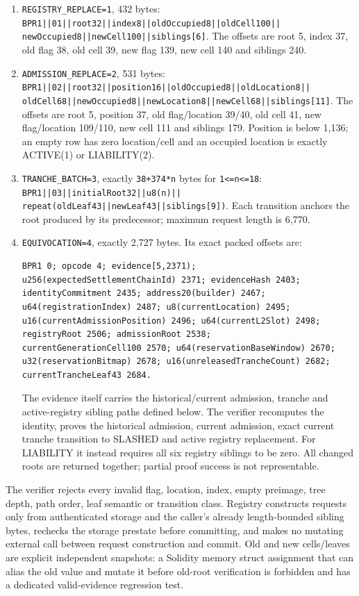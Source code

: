 \documentclass[a4paper,11pt]{article}
\newcommand{\code}[1]{\nolinkurl{#1}}
\begin{document}
\begin{enumerate}
\item \code{REGISTRY_REPLACE=1}, 432 bytes:
\code{BPR1||01||root32||index8||oldOccupied8||oldCell100||}
\code{newOccupied8||newCell100||siblings[6]}.  The offsets are root 5,
index 37, old flag 38, old cell 39, new flag 139, new cell 140 and siblings
240.
\item \code{ADMISSION_REPLACE=2}, 531 bytes:
\code{BPR1||02||root32||position16||oldOccupied8||oldLocation8||}
\code{oldCell68||newOccupied8||newLocation8||newCell68||siblings[11]}.
The offsets are root 5, position 37, old flag/location 39/40, old cell 41,
new flag/location 109/110, new cell 111 and siblings 179.  Position is below
1,136; an empty row has zero location/cell and an occupied location is exactly
ACTIVE(1) or LIABILITY(2).
\item \code{TRANCHE_BATCH=3}, exactly \code{38+374*n} bytes for
\code{1<=n<=18}:
\code{BPR1||03||initialRoot32||u8(n)||}
\code{repeat(oldLeaf43||newLeaf43||siblings[9])}.  Each transition anchors
the root produced by its predecessor; maximum request length is 6,770.
\item \code{EQUIVOCATION=4}, exactly 2,727 bytes.  Its exact packed offsets
are:
\begin{verbatim}
BPR1 0; opcode 4; evidence[5,2371);
u256(expectedSettlementChainId) 2371; evidenceHash 2403;
identityCommitment 2435; address20(builder) 2467;
u64(registrationIndex) 2487; u8(currentLocation) 2495;
u16(currentAdmissionPosition) 2496; u64(currentL2Slot) 2498;
registryRoot 2506; admissionRoot 2538;
currentGenerationCell100 2570; u64(reservationBaseWindow) 2670;
u32(reservationBitmap) 2678; u16(unreleasedTrancheCount) 2682;
currentTrancheLeaf43 2684.
\end{verbatim}
The evidence itself carries the historical/current admission, tranche and
active-registry sibling paths defined below.  The verifier recomputes the
identity, proves the historical admission, current admission, exact current
tranche transition to SLASHED and active registry replacement.  For LIABILITY
it instead requires all six registry siblings to be zero.  All changed roots
are returned together; partial proof success is not representable.
\end{enumerate}
The verifier rejects every invalid flag, location, index, empty preimage,
tree depth, path order, leaf semantic or transition class.  Registry constructs
requests only from authenticated storage and the caller's already
length-bounded sibling bytes, rechecks the storage prestate before committing,
and makes no mutating external call between request construction and commit.
Old and new cells/leaves are explicit independent snapshots: a Solidity memory
struct assignment that can alias the old value and mutate it before old-root
verification is forbidden and has a dedicated valid-evidence regression test.
\end{document}
